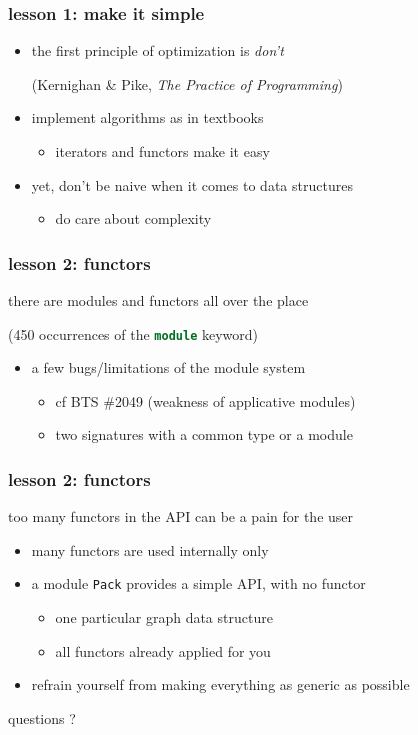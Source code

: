 \documentclass{beamer}
\let\emph\alert
\newcommand{\of}[1]{\lstinline[language=ocaml]{#1}}
\begin{document}
\begin{frame}\frametitle{lesson 1: make it simple}
  \begin{itemize}
  \item \emph{the first principle of optimization is \textit{don't}} \par
    (Kernighan \& Pike, \textit{The Practice of Programming})

  \bigskip
  \item implement algorithms as in textbooks
    \begin{itemize}
    \item iterators and functors make it easy
    \end{itemize}

  \bigskip
  \item yet, don't be naive when it comes to data structures
    \begin{itemize}
    \item do care about complexity
    \end{itemize}
  \end{itemize}
\end{frame}

\begin{frame}\frametitle{lesson 2: functors}
  there are modules and functors all over the place

  (450 occurrences of the \of{module} keyword)

  \bigskip
  \begin{itemize}
  \item a few bugs/limitations of the module system
    \begin{itemize}
    \item cf BTS \#2049 (weakness of applicative modules)
    \item two signatures with a common type or a module
    \end{itemize}
  \end{itemize}
\end{frame}

\begin{frame}\frametitle{lesson 2: functors}
  too many functors in the API can be a pain for the user

  \bigskip
  \begin{itemize}
    \item many functors are used internally only

      \bigskip
    \item a module \of{Pack} provides a simple API, with no functor
      \begin{itemize}
      \item one particular graph data structure
      \item all functors already applied for you
      \end{itemize}

  \bigskip
  \item refrain yourself from making everything as generic as possible
  \end{itemize}
\end{frame}

\begin{frame}
  \begin{center}
    questions ?
  \end{center}
\end{frame}
\end{document}
